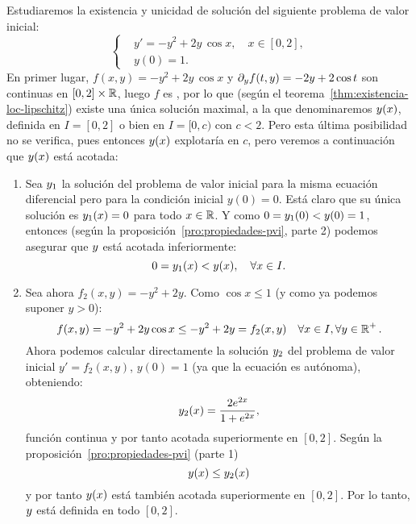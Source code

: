 \begin{example}
  \renewcommand{\tt}{x}
  \label{ex:existencia-unicidad-loc-lipschitz}
  Estudiaremos la existencia y unicidad de solución del siguiente
  problema de valor inicial: 
  \begin{equation*}
    \left\{
      \begin{aligned}
        &y' = -y^2+2y\,\cos \tt, \quad \tt\in [0,2],\\
        &y(0)=1.
      \end{aligned}
    \right.
  \end{equation*}
  En primer lugar, $f(x,y)=-y^2+2y\,\cos \tt$ y $\partial_y f(t,y)=-2y+2\cos
  t$ son continuas en $[0,2]\times\operatorname{{\mathbb R}}$, luego $f$ es \locLipschitz,
  por lo que (según el teorema~\ref{thm:existencia-loc-lipschitz})
  existe una única solución maximal, a la que denominaremos
  $\sol(\tt)$, definida en $I=[0,2]$ o bien en $I=[0,c)$ con
  $c<2$. Pero esta última posibilidad no se verifica, pues entonces
  $\sol(\tt)$ explotaría en $c$, pero veremos a continuación que
  $\sol(\tt)$ está acotada:
  \begin{enumerate}
  \item Sea $y_1$ la solución del problema de valor inicial para la
    misma ecuación diferencial pero para la condición inicial
    $y(0)=0$. Está claro que su única solución es $\sol_1(\tt)=0$
    para todo $\tt\in\Rset$. Y como $0=y_1(0)<y(0)=1$, entonces
    (según la proposición~\ref{pro:propiedades-pvi}, parte 2) podemos
    asegurar que $y$ está acotada inferiormente:
    \begin{equation*}
      0=\sol_1(\tt)<\sol(\tt), \quad \forall \tt\in I.
    \end{equation*}
  \item Sea ahora $f_2(\tt,y)=-y^2+2y$. Como $\cos\tt \le 1$  (y como
    ya podemos suponer $y>0$):
    $$f(\tt,y)=-y^2+2y\cos\tt \le -y^2+2y = f_2(\tt,y)\quad
    \forall \tt\in I, \forall y\in\Rset^+.$$ 
    Ahora podemos calcular
    directamente la solución $y_2$ del problema de valor inicial
    $y'=f_2(\tt,y)$, $y(0)=1$ (ya que la ecuación es autónoma),
    obteniendo:
    $$
    \sol_2(\tt)=\frac{2e^{2\tt}}{1+e^{2\tt}},
    $$
    función continua y por tanto acotada superiormente en $[0,2]$.
    Según la proposición~\ref{pro:propiedades-pvi} (parte 1)
    \begin{equation*}
      \sol(\tt)\le\sol_2(\tt)
    \end{equation*}
    y por tanto $\sol(\tt)$ está también acotada superiormente en
    $[0,2]$. Por lo tanto, $y$ está definida en todo $[0,2]$.
  \end{enumerate}
  \renewcommand{\tt}{t}
\end{example}


